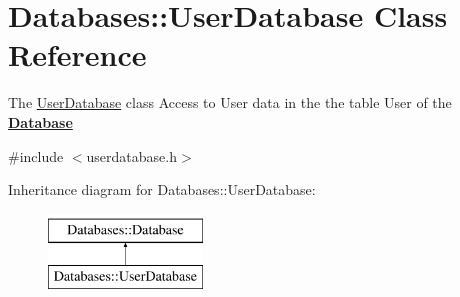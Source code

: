 \hypertarget{classDatabases_1_1UserDatabase}{\section{Databases\-:\-:User\-Database Class Reference}
\label{classDatabases_1_1UserDatabase}
}


The \hyperlink{classDatabases_1_1UserDatabase}{User\-Database} class Access to User data in the the table User of the {\bfseries \hyperlink{classDatabases_1_1Database}{Database}}  




{\ttfamily \#include $<$userdatabase.\-h$>$}

Inheritance diagram for Databases\-:\-:User\-Database\-:\begin{figure}[H]
\begin{center}
\leavevmode
\includegraphics[height=2.000000cm]{d0/d33/classDatabases_1_1UserDatabase}
\end{center}
\end{figure}
